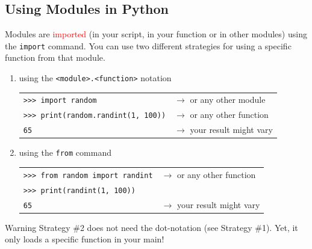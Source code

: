 \documentclass[t,handout,9pt]{beamer}
\begin{document}
\subsection{Using Modules in Python}
\begin{frame}
Modules are \textcolor{red}{imported} (in your script, in your function or in other modules) using the \texttt{import} command.
\vfill
You can use two different strategies for using a specific function from that module.
\begin{enumerate}
	\item using the \texttt{<module>.<function>} notation\\
	\begin{table}[]
	\begin{flushleft}
	\begin{tabular}{ll}
	\texttt{>{}>{}> import random}        & $\rightarrow$ or any other module\\
	\texttt{>{}>{}> print(random.randint(1, 100))}        & $\rightarrow$ or any other function\\
	\texttt{65}        & $\rightarrow$ your result might vary\\
	\end{tabular}
	\end{flushleft}
	\end{table}
	\item using the \texttt{from} command\\
	\begin{table}[]
	\begin{flushleft}
	\begin{tabular}{ll}
	\texttt{>{}>{}> from random import randint}        & $\rightarrow$ or any other function\\
	\texttt{>{}>{}> print(randint(1, 100))}        &  \\
	\texttt{65}        & $\rightarrow$ your result might vary\\
	\end{tabular}
	\end{flushleft}
	\end{table}
\end{enumerate}
\vfill
\begin{block}{Warning}
Strategy \#2 does not need the dot-notation (see Strategy \#1). Yet, it only loads a specific function in your main!
\end{block}
\vfill
\end{frame}
%
\end{document}
